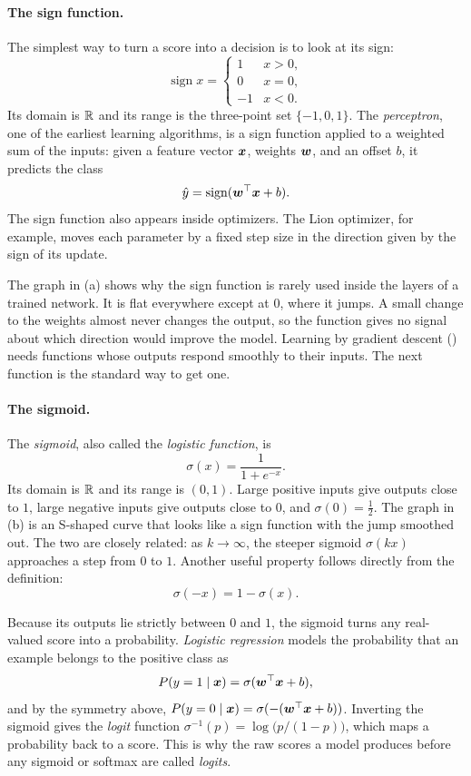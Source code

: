 \paragraph{The sign function.}
The simplest way to turn a score into a decision is to look at its sign:
\[
  \operatorname{sign} x =
  \begin{cases}
    1 & x > 0, \\
    0 & x = 0, \\
    -1 & x < 0.
  \end{cases}
\]
Its domain is $\mathbb{R}$ and its range is the three-point set $\{-1, 0, 1\}$.
The \emph{perceptron}, one of the earliest learning algorithms, is a sign
function applied to a weighted sum of the inputs: given a feature vector
$\bm{x}$, weights $\bm{w}$, and an offset $b$, it predicts the class
\[
  \hat{y} = \operatorname{sign}(\bm{w}^\top \bm{x} + b).
\]
The sign function also appears inside optimizers. The Lion optimizer, for
example, moves each parameter by a fixed step size in the direction given
by the sign of its update.

The graph in (a) shows why the sign function is
rarely used inside the layers of a trained network. It is flat everywhere
except at $0$, where it jumps. A small change to the weights almost never
changes the output, so the function gives no signal about which direction
would improve the model. Learning by gradient descent
() needs functions whose outputs respond smoothly to their
inputs. The next function is the standard way to get one.

\paragraph{The sigmoid.}
The \emph{sigmoid}, also called the \emph{logistic function}, is
\[
  \sigma(x) = \frac{1}{1 + e^{-x}}.
\]
Its domain is $\mathbb{R}$ and its range is $(0, 1)$. Large positive inputs give
outputs close to $1$, large negative inputs give outputs close to $0$, and
$\sigma(0) = \tfrac12$. The graph in (b) is an
S-shaped curve that looks like a sign function with the jump smoothed out.
The two are closely related: as $k \to \infty$, the steeper sigmoid
$\sigma(kx)$ approaches a step from $0$ to $1$. Another useful property follows directly from the
definition:
\[
  \sigma(-x) = 1 - \sigma(x).
\]

Because its outputs lie strictly between $0$ and $1$, the sigmoid turns any
real-valued score into a probability. \emph{Logistic regression} models the
probability that an example belongs to the positive class as
\[
  P(y = 1 \mid \bm{x}) = \sigma(\bm{w}^\top \bm{x} + b),
\]
and by the symmetry above, $P(y = 0 \mid \bm{x}) = \sigma(-(\bm{w}^\top
\bm{x} + b))$. Inverting the sigmoid gives the \emph{logit} function
$\sigma^{-1}(p) = \log\bigl(p / (1 - p)\bigr)$, which maps a probability
back to a score. This is why the raw scores a model produces before any
sigmoid or softmax are called \emph{logits}.

